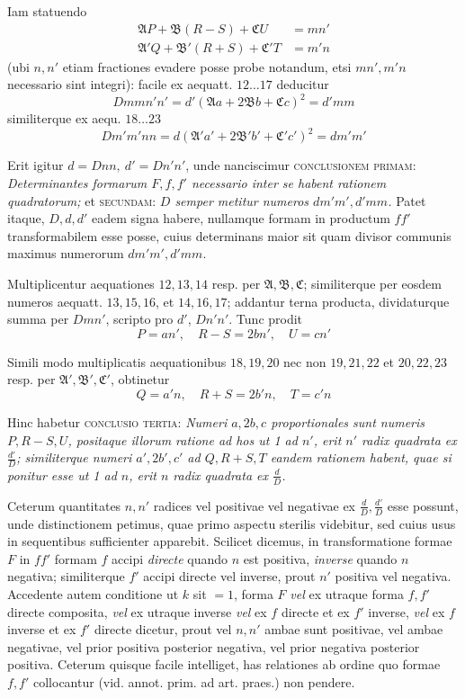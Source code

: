 Iam statuendo
\[
\begin{aligned}
\mathfrak{A}P+\mathfrak{B}(R-S)+\mathfrak{C}U&=mn'\\
\mathfrak{A}'Q+\mathfrak{B}'(R+S)+\mathfrak{C}'T&=m'n
\end{aligned}
\]
(ubi $n,n'$ etiam fractiones evadere posse probe notandum, etsi $mn',m'n$ necessario sint integri): facile ex aequatt. $12\ldots17$ deducitur
\[
Dmmn'n'=d'(\mathfrak{A}a+2\mathfrak{B}b+\mathfrak{C}c)^2=d'mm
\]
similiterque ex aequ. $18\ldots23$
\[
Dm'm'nn=d(\mathfrak{A}'a'+2\mathfrak{B}'b'+\mathfrak{C}'c')^2=dm'm'
\]

Erit igitur $d=Dnn,\ d'=Dn'n'$, unde nanciscimur \textsc{conclusionem primam}: \textit{Determinantes formarum $F,f,f'$ necessario inter se habent rationem quadratorum;} et \textsc{secundam}: \textit{$D$ semper metitur numeros $dm'm',d'mm$.} Patet itaque, $D,d,d'$ eadem signa habere, nullamque formam in productum $ff'$ transformabilem esse posse, cuius determinans maior sit quam divisor communis maximus numerorum $dm'm',d'mm$.

Multiplicentur aequationes $12,13,14$ resp. per $\mathfrak{A},\mathfrak{B},\mathfrak{C}$; similiterque per eosdem numeros aequatt. $13,15,16$, et $14,16,17$; addantur terna producta, dividaturque summa per $Dmn'$, scripto pro $d'$, $Dn'n'$. Tunc prodit
\[
P=an',\quad R-S=2bn',\quad U=cn'
\]

Simili modo multiplicatis aequationibus $18,19,20$ nec non $19,21,22$ et $20,22,23$ resp. per $\mathfrak{A}',\mathfrak{B}',\mathfrak{C}'$, obtinetur
\[
Q=a'n,\quad R+S=2b'n,\quad T=c'n
\]

Hinc habetur \textsc{conclusio tertia}: \textit{Numeri $a,2b,c$ proportionales sunt numeris $P,R-S,U$, positaque illorum ratione ad hos ut 1 ad $n'$, erit $n'$ radix quadrata ex $\frac{d'}{D}$; similiterque numeri $a',2b',c'$ ad $Q,R+S,T$ eandem rationem habent, quae si ponitur esse ut 1 ad $n$, erit $n$ radix quadrata ex $\frac{d}{D}$.}

Ceterum quantitates $n,n'$ radices vel positivae vel negativae ex $\frac{d}{D},\frac{d'}{D}$ esse possunt, unde distinctionem petimus, quae primo aspectu sterilis videbitur, sed cuius usus in sequentibus sufficienter apparebit. Scilicet dicemus, in transformatione formae $F$ in $ff'$ formam $f$ accipi \textit{directe} quando $n$ est positiva, \textit{inverse} quando $n$ negativa; similiterque $f'$ accipi directe vel inverse, prout $n'$ positiva vel negativa. Accedente autem conditione ut $k$ sit $=1$, forma $F$ \textit{vel} ex utraque forma $f,f'$ directe composita, \textit{vel} ex utraque inverse \textit{vel} ex $f$ directe et ex $f'$ inverse, \textit{vel} ex $f$ inverse et ex $f'$ directe dicetur, prout vel $n,n'$ ambae sunt positivae, vel ambae negativae, vel prior positiva posterior negativa, vel prior negativa posterior positiva. Ceterum quisque facile intelliget, has relationes ab ordine quo formae $f,f'$ collocantur (vid. annot. prim. ad art. praes.) non pendere.

